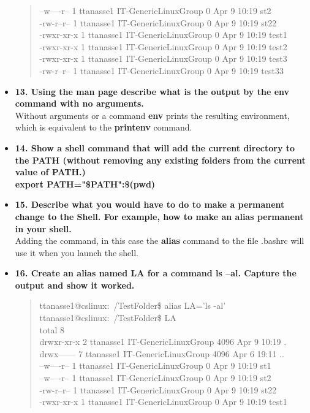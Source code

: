 \documentclass{article}
\begin{document}
\begin{itemize}
\begin{quote}
--w----r-- 1 ttanasse1 IT-GenericLinuxGroup 0 Apr  9 10:19 st2\\
-rw-r--r-- 1 ttanasse1 IT-GenericLinuxGroup 0 Apr  9 10:19 st22\\
-rwxr-xr-x 1 ttanasse1 IT-GenericLinuxGroup 0 Apr  9 10:19 test1\\
-rwxr-xr-x 1 ttanasse1 IT-GenericLinuxGroup 0 Apr  9 10:19 test2\\
-rwxr-xr-x 1 ttanasse1 IT-GenericLinuxGroup 0 Apr  9 10:19 test3\\
-rw-r--r-- 1 ttanasse1 IT-GenericLinuxGroup 0 Apr  9 10:19 test33
\end{quote}
\item \textbf{13. Using the man page describe what is the output by the env command with no arguments.}\\
Without arguments or a command \textbf{env} prints the resulting environment, which is equivalent to the \textbf{printenv} command.
\item \textbf{14. Show a shell command that will add the current directory to the PATH (without removing any existing folders from the current value of PATH.) }\\
\textbf{export PATH="\$PATH":\$(pwd)}
\item \textbf{15. Describe what you would have to do to make a permanent change to the Shell. For example, how to make an alias permanent in your shell. }\\
Adding the command, in this case the \textbf{alias} command to the file .bashrc will use it when you launch the shell.
\item \textbf{16. Create an alias named LA for a command ls –al.  Capture the output and show it worked.}
\begin{quote}
  ttanasse1@cslinux:~/TestFolder\$ alias LA='ls -al'\\
ttanasse1@cslinux:~/TestFolder\$ LA\\
total 8\\
drwxr-xr-x 2 ttanasse1 IT-GenericLinuxGroup 4096 Apr  9 10:19 .\\
drwx------ 7 ttanasse1 IT-GenericLinuxGroup 4096 Apr  6 19:11 ..\\
--w----r-- 1 ttanasse1 IT-GenericLinuxGroup    0 Apr  9 10:19 st1\\
--w----r-- 1 ttanasse1 IT-GenericLinuxGroup    0 Apr  9 10:19 st2\\
-rw-r--r-- 1 ttanasse1 IT-GenericLinuxGroup    0 Apr  9 10:19 st22\\
-rwxr-xr-x 1 ttanasse1 IT-GenericLinuxGroup    0 Apr  9 10:19 test1\\

\end{quote}
\end{itemize}
\end{document}
